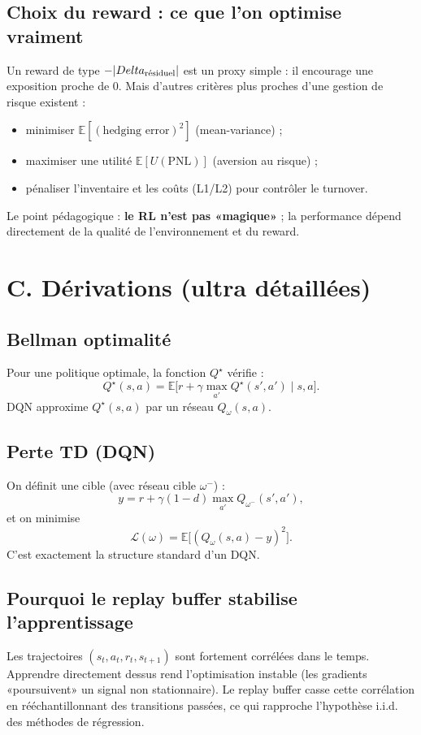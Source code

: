 \documentclass[11pt,a4paper]{report}
\theoremstyle{definition}
\theoremstyle{plain}
\theoremstyle{remark}
\newcommand{\E}{\mathbb{E}}
\newcommand{\1}{\mathbf{1}}
\begin{document}
\subsection*{Choix du reward : ce que l'on optimise vraiment}
Un reward de type $-|\\Delta_{\text{résiduel}}|$ est un proxy simple : il encourage une exposition proche de 0.
Mais d'autres critères plus proches d'une gestion de risque existent :
\begin{itemize}[leftmargin=*]
\item minimiser $\E[(\text{hedging error})^2]$ (mean-variance) ;
\item maximiser une utilité $\E[U(\text{PNL})]$ (aversion au risque) ;
\item pénaliser l'inventaire et les coûts (L1/L2) pour contrôler le turnover.
\end{itemize}
Le point pédagogique : \textbf{le RL n'est pas «magique»} ; la performance dépend directement de la qualité de l'environnement et du reward.

\section{C. Dérivations (ultra détaillées)}
\subsection*{Bellman optimalité}
Pour une politique optimale, la fonction $Q^\star$ vérifie :
\[
Q^\star(s,a)=\E\big[r+\gamma\max_{a'}Q^\star(s',a')\mid s,a\big].
\]
DQN approxime $Q^\star(s,a)$ par un réseau $Q_\omega(s,a)$.

\subsection*{Perte TD (DQN)}
On définit une cible (avec réseau cible $\omega^-$) :
\[
y = r + \gamma(1-d)\max_{a'} Q_{\omega^-}(s',a'),
\]
et on minimise
\[
\mathcal{L}(\omega)=\E\big[(Q_\omega(s,a)-y)^2\big].
\]
C'est exactement la structure standard d'un DQN.

\subsection*{Pourquoi le replay buffer stabilise l'apprentissage}
Les trajectoires $(s_t,a_t,r_t,s_{t+1})$ sont fortement corrélées dans le temps.
Apprendre directement dessus rend l'optimisation instable (les gradients «poursuivent» un signal non stationnaire).
Le replay buffer casse cette corrélation en rééchantillonnant des transitions passées, ce qui rapproche l'hypothèse i.i.d. des méthodes de régression.
\end{document}

